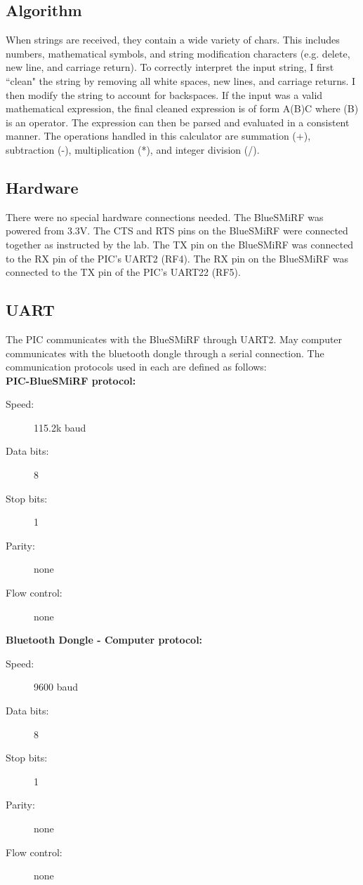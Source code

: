 \documentclass[11pt]{article}
\begin{document}
\subsection{Algorithm}

When strings are received, they contain a wide variety of chars. This includes numbers, mathematical symbols, and string modification characters (e.g. delete, new line, and carriage return). To correctly interpret the input string, I first ``clean" the string by removing all white spaces, new lines, and carriage returns. I then modify the string to account for backspaces. If the input was a valid mathematical expression, the final cleaned expression is of form A(B)C where (B) is an operator. The expression can then be parsed and evaluated in a consistent manner. The operations handled in this calculator are summation (+), subtraction (-), multiplication (*), and integer division (/).


\subsection{Hardware}
There were no special hardware connections needed. The BlueSMiRF was powered from 3.3V. The CTS and RTS pins on the BlueSMiRF were connected together as instructed by the lab. The TX pin on the BlueSMiRF was connected to the RX pin of the PIC's UART2 (RF4). The RX pin on the BlueSMiRF was connected to the TX pin of the PIC's UART22 (RF5). 
	

\subsection{UART}

The PIC communicates with the BlueSMiRF through UART2. May computer communicates with the bluetooth dongle through a serial connection. The communication protocols used in each are defined as follows: \\

\textbf{PIC-BlueSMiRF protocol:}
\begin{description}
	\item[Speed: ] 115.2k baud
	\item[Data bits: ] 8
	\item[Stop bits: ] 1
	\item[Parity: ] none
	\item[Flow control: ] none \\
\end{description}

\textbf{Bluetooth Dongle - Computer protocol:}
\begin{description}
	\item[Speed: ] 9600 baud
	\item[Data bits: ] 8
	\item[Stop bits: ] 1
	\item[Parity: ] none
	\item[Flow control: ] none \\
\end{description}
\end{document}
